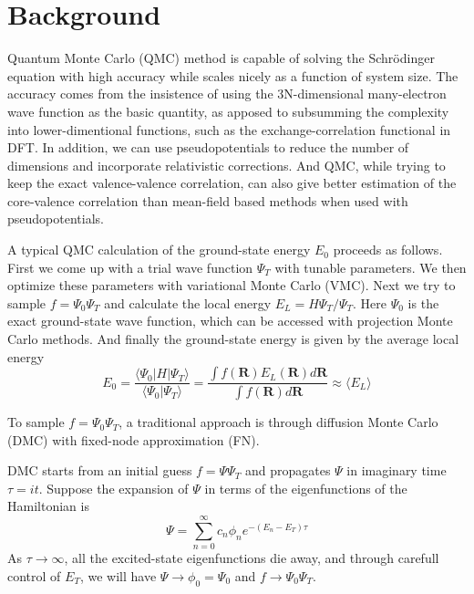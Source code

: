 \documentclass[aps,prl,reprint,groupedaddress]{revtex4-1}
\begin{document}
\section{\label{sec:background}Background}
Quantum Monte Carlo (QMC) method is capable of solving the Schrödinger equation with high accuracy while scales nicely as a function of system size.
The accuracy comes from the insistence of using the 3N-dimensional many-electron wave function as the basic quantity, as apposed to subsumming the complexity into lower-dimentional functions, such as the exchange-correlation functional in DFT.
In addition, we can use pseudopotentials to reduce the number of dimensions and incorporate relativistic corrections.
And QMC, while trying to keep the exact valence-valence correlation, can also give better estimation of the core-valence correlation than mean-field based methods when used with pseudopotentials.

A typical QMC calculation of the ground-state energy $E_0$ proceeds as follows. First we come up with a trial wave function $\Psi_T$ with tunable parameters.
We then optimize these parameters with variational Monte Carlo (VMC).
Next we try to sample $f = \Psi_0\Psi_T$ and calculate the local energy $E_L = H\Psi_T/\Psi_T$.
Here $\Psi_0$ is the exact ground-state wave function, which can be accessed with projection Monte Carlo methods.
And finally the ground-state energy is given by the average local energy
\begin{equation}
E_0 = \frac{\langle \Psi_0|H|\Psi_T \rangle}{\langle \Psi_0|\Psi_T \rangle}
= \frac{\int f(\mathbf{R})E_L(\mathbf{R})d\mathbf{R}}{\int f(\mathbf{R})d\mathbf{R}} \approx \langle E_L \rangle
\end{equation}

To sample $f = \Psi_0\Psi_T$, a traditional approach is through diffusion Monte Carlo (DMC) with fixed-node approximation (FN).

DMC starts from an initial guess $f = \Psi\Psi_T$ and propagates $\Psi$ in imaginary time $\tau=it$.
Suppose the expansion of $\Psi$ in terms of the eigenfunctions of the Hamiltonian is
\begin{equation}
\Psi = \sum_{n=0}^{\infty}c_n\phi_ne^{-(E_n-E_T)\tau}
\end{equation}
As $\tau\to\infty$, all the excited-state eigenfunctions die away, and through carefull control of $E_T$, we will have $\Psi\to\phi_0=\Psi_0$ and $f\to\Psi_0\Psi_T$.
\end{document}
